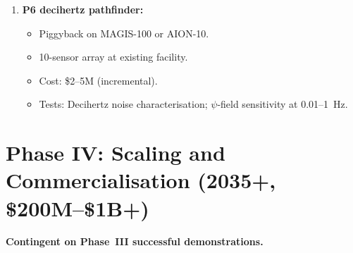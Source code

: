 \documentclass[11pt]{article}
\begin{document}
\begin{tcolorbox}[colback=blue!5!white, colframe=blue!60!black,
  title=\textbf{Phase III: First Technology Demonstrations}]
\begin{enumerate}
\item \textbf{P6 decihertz pathfinder:}
  \begin{itemize}[nosep]
    \item Piggyback on MAGIS-100 or AION-10.
    \item 10-sensor array at existing facility.
    \item Cost: \$2--5M (incremental).
    \item Tests: Decihertz noise characterisation; $\psi$-field
      sensitivity at 0.01--1~Hz.
  \end{itemize}
\end{enumerate}
\end{tcolorbox}

\section{Phase IV: Scaling and Commercialisation (2035+, \$200M--\$1B+)}
\label{sec:phase4}

\textbf{Contingent on Phase~III successful demonstrations.}
\end{document}
